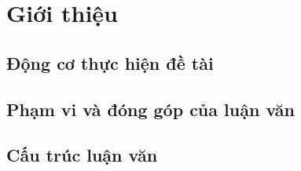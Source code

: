 \section{Giới thiệu}
\subsection{Động cơ thực hiện đề tài}
\subsection{Phạm vi và đóng góp của luận văn}
\subsection{Cấu trúc luận văn}

